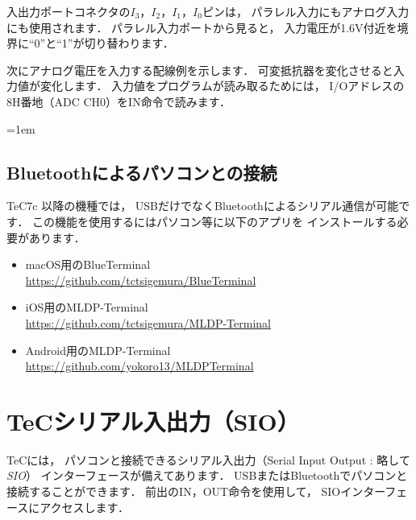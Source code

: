 入出力ポートコネクタの$I_3$，$I_2$，$I_1$，$I_0$ピンは，
パラレル入力にもアナログ入力にも使用されます．
パラレル入力ポートから見ると，
入力電圧が1.6V付近を境界に``0''と``1''が切り替わります．

次にアナログ電圧を入力する配線例を示します．
可変抵抗器を変化させると入力値が変化します．
入力値をプログラムが読み取るためには，
I/Oアドレスの8H番地（ADC CH0）をIN命令で読みます．

\begin{center}
\end{center}

\begin{framed}{\parindent=1em
  \subsection*{Bluetoothによるパソコンとの接続}
  {\small TeC7c 以降の機種では，
    USBだけでなくBluetoothによるシリアル通信が可能です．
    この機能を使用するにはパソコン等に以下のアプリを
    インストールする必要があります．

    \begin{itemize}
    \item macOS用のBlueTerminal\label{BlueTerminal} \\
      \url{https://github.com/tctsigemura/BlueTerminal}
    \item iOS用のMLDP-Terminal \\
      \url{https://github.com/tctsigemura/MLDP-Terminal}
    \item Android用のMLDP-Terminal \\
      \url{https://github.com/yokoro13/MLDPTerminal}
    \end{itemize}
  }
}\end{framed}

\newpage
\section{TeCシリアル入出力（SIO）}
\label{sio}
TeCには，
パソコンと接続できるシリアル入出力（Serial Input Output : 略して \emph{SIO}）
インターフェースが備えてあります．
USBまたはBluetoothでパソコンと接続することができます．
前出のIN，OUT命令を使用して，
SIOインターフェースにアクセスします．

